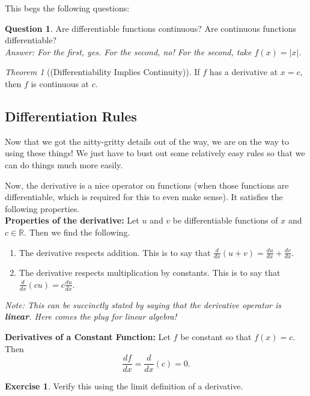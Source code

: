 \documentclass[leqno]{article}
\theoremstyle{definition}
\newtheorem{question}{Question}[section]
\newtheorem{exercise}{Exercise}[section]
\theoremstyle{remark}
\theoremstyle{theorem}
\newtheorem{theorem}{Theorem}[section]
\newcommand{\R}{\mathbb{R}}
\begin{document}
This begs the following questions: 

\begin{question}
Are differentiable functions continuous? Are continuous functions differentiable?\\
\noindent \emph{Answer: For the first, yes. For the second, no! For the second, take $f(x)=|x|$.}
\end{question}

\begin{theorem}[(Differentiability Implies Continuity)]
If $f$ has a derivative at $x=c$, then $f$ is continuous at $c$.
\end{theorem}

\subsection{Differentiation Rules}

Now that we got the nitty-gritty details out of the way, we are on the way to using these things!  We just have to bust out some relatively easy rules so that we can do things much more easily.

Now, the derivative is a nice operator on functions (when those functions are differentiable, which is required for this to even make sense).  It satisfies the following properties.\\

\noindent \textbf{Properties of the derivative:} Let $u$ and $v$ be differentiable functions of $x$ and $c\in \R$. Then we find the following.
\begin{enumerate}[1.]
\item The derivative respects addition.  This is to say that $\frac{d}{dx}(u+v)=\frac{du}{dx}+\frac{dv}{dx}$.  
\item The derivative respects multiplication by constants. This is to say that $\frac{d}{dx}(cu)=c\frac{du}{dx}$.
\end{enumerate}
\emph{Note: This can be succinctly stated by saying that the derivative operator is \textbf{linear}. Here comes the plug for linear algebra!}


\noindent \textbf{Derivatives of a Constant Function:} Let $f$ be constant so that $f(x)=c$. Then
\[
\frac{df}{dx}=\frac{d}{dx}(c)=0.
\]

\begin{exercise}
Verify this using the limit definition of a derivative.
\vspace*{5cm}\\
\end{exercise}
\end{document}
